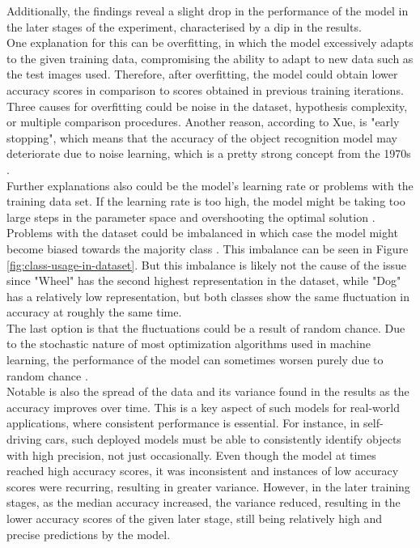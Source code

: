 
Additionally, the findings reveal a slight drop in the performance of the model in the later stages of the experiment, 
characterised by a dip in the results. \\

One explanation for this can be overfitting, in which the model excessively adapts to the given training data, compromising the ability to 
adapt to new data such as the test images used. Therefore, after overfitting, the model could obtain lower accuracy scores in comparison 
to scores obtained in previous training iterations. Three causes for overfitting could be noise in the dataset, 
hypothesis complexity, or multiple comparison procedures. Another reason, according to Xue, is "early stopping",
which means that the accuracy of the object recognition model may deteriorate due to noise learning,
which is a pretty strong concept from the 1970s \parencite[1--2]{Xue2019}. \\

Further explanations also could be the model's learning rate or problems with the training data set. If the learning rate is too high, the
model might be taking too large steps in the parameter space and overshooting the optimal solution \parencite{GreatLearningTeam2020}.
Problems with the dataset could be imbalanced in which case the model might become biased towards the majority class \parencite{Brownlee2019a}. 
This imbalance can be seen in Figure \ref{fig:class-usage-in-dataset}. But this imbalance is likely not the cause of the issue since 
"Wheel" has the second highest representation in the dataset, while "Dog" has a relatively low representation, but both classes show the same 
fluctuation in accuracy at roughly the same time. \\

The last option is that the fluctuations could be a result of random chance. Due to the stochastic nature of most optimization algorithms
used in machine learning, the performance of the model can sometimes worsen purely due to random chance \parencite{Brownlee2021}. \\


Notable is also the spread of the data and its variance found in the results as the accuracy improves over time. This is a key aspect of such models for real-world applications, where consistent performance is essential. For instance, in self-driving cars, such deployed models must be able to consistently identify objects with high precision, not just occasionally. Even though the model at times reached high accuracy scores, it was inconsistent and instances of low accuracy scores were recurring, resulting in greater variance. However, in the later training stages,  as the median accuracy increased, the variance reduced, resulting in the lower accuracy scores of the given later stage, still being relatively high and precise predictions by the model.    \\

